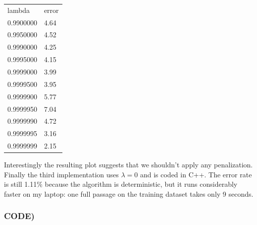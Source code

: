 \documentclass{article}
\begin{document}
\begin{center}
\begin{tabular}{ll}
lambda     &error\\
0.9900000  &4.64\\
0.9950000  &4.52\\
0.9990000  &4.25\\
0.9995000  &4.15\\
0.9999000  &3.99\\
0.9999500  &3.95\\
0.9999900  &5.77\\
0.9999950  &7.04\\
0.9999990  &4.72\\
0.9999995  &3.16\\
0.9999999  &2.15
\end{tabular}
\end{center}

Interestingly the resulting plot suggests that we shouldn't apply any penalization. Finally the third implementation uses $\lambda=0$ and is coded in C++. The error rate is still 1.11\% because the algorithm is deterministic, but it runs considerably faster on my laptop: one full passage on the training dataset takes only 9 seconds.

\newpage

\subsubsection*{CODE)}
\end{document}
